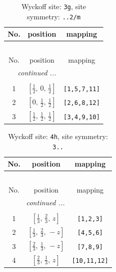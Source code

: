 \documentclass[fleqn,8pt]{jsarticle}
\begin{document}
\begin{longtable}{ccc}
\caption{Wyckoff site: {\tt 3g}, site symmetry: {\tt ..2/m}}
 \\
 \hline \hline
No. & position & mapping \\ \hline \endfirsthead

\multicolumn{2}{l}{\tablename\ \thetable{}} \\
 \hline \hline
No. & position & mapping \\ \hline \endhead

 \hline \hline
\multicolumn{2}{r}{\footnotesize\it continued ...} \\ \endfoot

 \hline \hline
\multicolumn{2}{r}{} \\ \endlastfoot

1 & $\left[ \frac{1}{2},\, 0,\, \frac{1}{2} \right]$ & {\tt [1,5,7,11]} \\ \hline
2 & $\left[ 0,\, \frac{1}{2},\, \frac{1}{2} \right]$ & {\tt [2,6,8,12]} \\ \hline
3 & $\left[ \frac{1}{2},\, \frac{1}{2},\, \frac{1}{2} \right]$ & {\tt [3,4,9,10]} \\
\end{longtable}
\renewcommand{\arraystretch}{1.2}
\begin{longtable}{ccc}
\caption{Wyckoff site: {\tt 4h}, site symmetry: {\tt 3..}}
 \\
 \hline \hline
No. & position & mapping \\ \hline \endfirsthead

\multicolumn{2}{l}{\tablename\ \thetable{}} \\
 \hline \hline
No. & position & mapping \\ \hline \endhead

 \hline \hline
\multicolumn{2}{r}{\footnotesize\it continued ...} \\ \endfoot

 \hline \hline
\multicolumn{2}{r}{} \\ \endlastfoot

1 & $\left[ \frac{1}{3},\, \frac{2}{3},\, z \right]$ & {\tt [1,2,3]} \\ \hline
2 & $\left[ \frac{1}{3},\, \frac{2}{3},\, - z \right]$ & {\tt [4,5,6]} \\ \hline
3 & $\left[ \frac{2}{3},\, \frac{1}{3},\, - z \right]$ & {\tt [7,8,9]} \\ \hline
4 & $\left[ \frac{2}{3},\, \frac{1}{3},\, z \right]$ & {\tt [10,11,12]} \\
\end{longtable}
\end{document}

